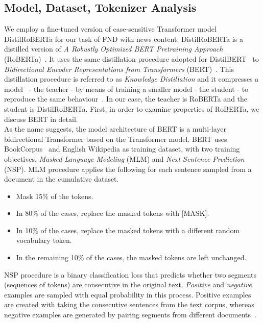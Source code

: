 \subsection{Model, Dataset, Tokenizer Analysis}
\label{subsec:newsContentModels_Model}
We employ a fine-tuned version of case-sensitive Transformer model DistilRoBERTa for our task of FND with news content. DistilRoBERTa is a distilled version of \emph{A Robustly Optimized BERT Pretraining Approach} (RoBERTa)~\parencite{RoBERTa_Liu}. It uses the same distillation procedure adopted for  DistilBERT~\parencite{DistilBERT_Sanh} to \emph{Bidirectional Encoder Representations from Transformers} (BERT)~\parencite{BERT_Devlin}. This distillation procedure is referred to as \emph{Knowledge Distillation} and it compresses a model~\parencite{ModelCompression_Bucilua} - the teacher - by means of training a smaller model - the student - to reproduce the same behaviour~\parencite{DistillingTheKnowledge_Hinton}. In our case, the teacher is  RoBERTa and the student is DistilRoBERTa. First, in order to examine properties of RoBERTa, we discuss BERT in detail.\\
As the name suggests, the model architecture of BERT is a multi-layer bidirectional Transformer based on the Transformer model. BERT uses BookCorpus~\parencite{BookCorpus_Yukun} and English Wikipedia as training dataset, with two training objectives, \emph{Masked Language Modeling} (MLM) and \emph{Next Sentence Prediction} (NSP). MLM procedure applies the following for each sentence sampled from a document in the cumulative dataset.
\begin{itemize}
    \item Mask 15\% of the tokens.
    \item In 80\% of the cases, replace the masked tokens with [MASK].
    \item In 10\% of the cases, replace the masked tokens with a different random vocabulary token.
    \item In the remaining 10\% of the cases, the masked tokens are left unchanged.
\end{itemize}
NSP procedure is a binary classification loss that predicts whether two segments (sequences of tokens) are consecutive in
the original text. \emph{Positive} and \emph{negative} examples are sampled with equal probability in this process.
Positive examples are created with taking the consecutive sentences from the text corpus, whereas negative examples
are generated by pairing segments from different documents~\parencite{RoBERTa_Liu}.\\




